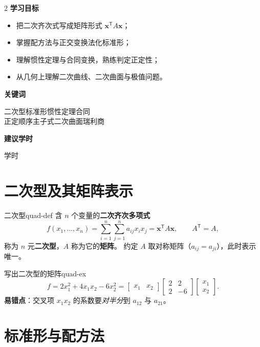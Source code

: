 \documentclass[11pt,a4paper,openany]{ctexbook}
\begin{document}
\begin{chapoutline}
\small
\begin{multicols}{2}
\textbf{学习目标}
\begin{itemize}[leftmargin=1.5em, itemsep=1.5pt]
\item 把二次齐次式写成矩阵形式 $\boldsymbol{x}^{\mathsf T}A\boldsymbol{x}$；
\item 掌握配方法与正交变换法化标准形；
\item 理解惯性定理与合同变换，熟练判定正定性；
\item 从几何上理解二次曲线、二次曲面与极值问题。
\end{itemize}
\columnbreak
\textbf{关键词}
\par\smallskip
二次型\quad 标准形\quad 惯性定理\quad 合同\\
正定\quad 顺序主子式\quad 二次曲面\quad 瑞利商
\par\smallskip
\textbf{建议学时}
\par{} 学时
\end{multicols}
\end{chapoutline}

\section{二次型及其矩阵表示}

\begin{defn}{二次型}{quad-def}
含 $n$ 个变量的\textbf{二次齐次多项式}
\[
f(x_1,\dots,x_n)=\sum_{i=1}^{n}\sum_{j=1}^{n}a_{ij}x_ix_j
=\boldsymbol{x}^{\mathsf T}A\boldsymbol{x},
\qquad A^{\mathsf T}=A,
\]
称为 $n$ 元\textbf{二次型}，$A$ 称为它的\textbf{矩阵}。
约定 $A$ 取对称矩阵（$a_{ij}=a_{ji}$），此时表示唯一。
\end{defn}

\begin{exmp}{写出二次型的矩阵}{quad-ex}
\[
f=2x_1^2+4x_1x_2-6x_2^2
=\begin{bmatrix}x_1&x_2\end{bmatrix}
\begin{bmatrix}2&2\\2&-6\end{bmatrix}
\begin{bmatrix}x_1\\x_2\end{bmatrix}.
\]
\textbf{易错点}：交叉项 $x_1x_2$ 的系数要\emph{对半分}到 $a_{12}$ 与 $a_{21}$。
\end{exmp}

\section{标准形与配方法}
\end{document}
